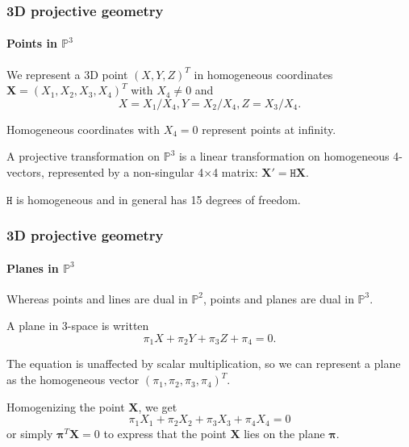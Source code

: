 \documentclass[aspectratio=169]{beamer}
\renewcommand{\vec}[1]{\boldsymbol{#1}}
\newcommand{\mat}[1]{\mathtt{#1}}
\def\Pset{\mathbb{P}}
\begin{document}
\begin{frame}
\frametitle{3D projective geometry}
\framesubtitle{Points in $\Pset^3$}

We represent a 3D point $(X,Y,Z)^T$ in homogeneous coordinates
$\vec{X}=(X_1,X_2,X_3,X_4)^T$ with $X_4\not=0$ and
\[ X=X_1/X_4, Y=X_2/X_4, Z=X_3/X_4.\]

\medskip

Homogeneous coordinates with $X_4=0$ represent \alert{points at
infinity}.

\medskip

A \alert{projective transformation on $\Pset^3$} is a linear
transformation on homogeneous 4-vectors, represented by a non-singular
4$\times$4 matrix: $\vec{X}' = \mat{H}\vec{X}$.

\medskip

$\mat{H}$ is homogeneous and in general has 15 degrees of freedom.

\end{frame}

\begin{frame}
\frametitle{3D projective geometry}
\framesubtitle{Planes in $\Pset^3$}

Whereas points and lines are dual in $\Pset^2$, \alert{points and
planes} are dual in $\Pset^3$.

\medskip

A plane in 3-space is written
\begin{equation*}
\pi_1 X + \pi_2 Y + \pi_3 Z + \pi_4 = 0.
\end{equation*}

\medskip

The equation is unaffected by scalar multiplication, so we can
represent a plane as the \alert{homogeneous vector}
$(\pi_1,\pi_2,\pi_3,\pi_4)^T$.

\medskip

Homogenizing the point $\vec{X}$, we get \[ \pi_1 X_1 + \pi_2 X_2 +
\pi_3 X_3 + \pi_4 X_4 = 0 \] or simply $\vec{\pi}^T\vec{X}=0$ to
express that the point $\vec{X}$ lies on the plane $\vec{\pi}$.

\end{frame}
\end{document}
